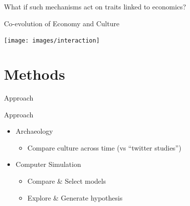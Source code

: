 \documentclass[12pt, notes=show,handout=no]{beamer}
\begin{document}
\begin{frame}
	\begin{center}
	    What if such mechanisms act on traits linked to economics?
	\end{center}
	\begin{center}
	\end{center}
\end{frame}

%
\begin{frame}{Co-evolution of Economy and Culture}

    \begin{center}
	\texttt{[image: images/interaction]}	
    \end{center}

\end{frame}



\section{Methods}
\begin{frame}
    \centering
    \Large
    Approach
\end{frame}


\begin{frame}{Approach}
    \begin{itemize}
	\item Archaeology
	    \begin{itemize}
		\item<3-> Compare culture across time (vs ``twitter studies'')
	    \end{itemize}
	    \vfill
	\item<2-> Computer Simulation
	    \begin{itemize}
		\item<4-> Compare \& Select models
		\item<5-> Explore \& Generate hypothesis
	    \end{itemize}
	    \vfill
    \end{itemize}
\end{frame}
\end{document}
